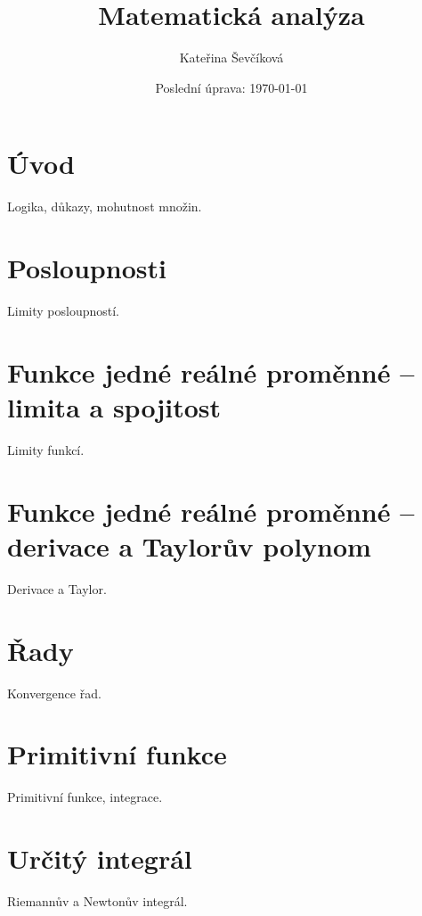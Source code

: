 \documentclass{article}
\title{Matematická analýza}
\author{Kateřina Ševčíková}
\date{Poslední úprava: \today}
\theoremstyle{definition}
\begin{document}
\maketitle

\tableofcontents
\newpage

\section{Úvod}
Logika, důkazy, mohutnost množin.

\section{Posloupnosti}
Limity posloupností.

\section{Funkce jedné reálné proměnné – limita a spojitost}
Limity funkcí.

\section{Funkce jedné reálné proměnné – derivace a Taylorův polynom}
Derivace a Taylor.

\section{Řady}
Konvergence řad.

\section{Primitivní funkce}
Primitivní funkce, integrace.

\section{Určitý integrál}
Riemannův a Newtonův integrál.


\end{document}
